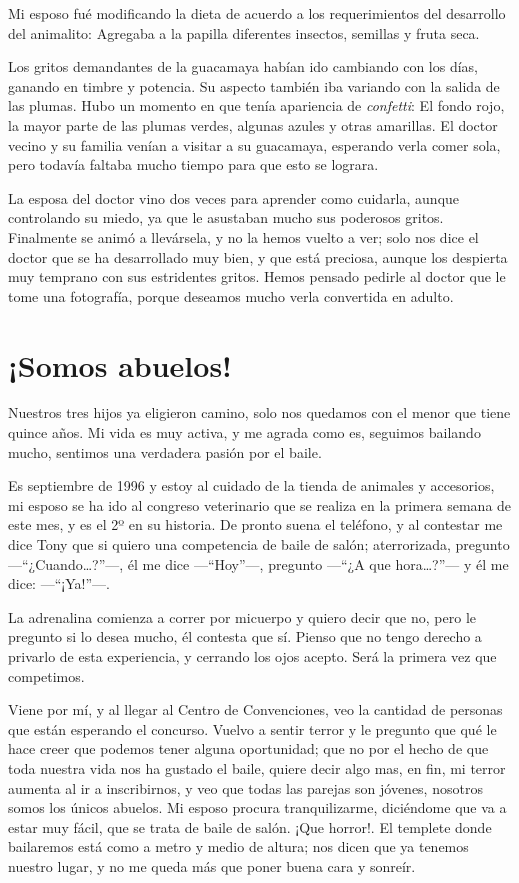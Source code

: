 \documentclass[letterpaper, 12pt]{book}
\begin{document}
Mi esposo fué modificando la dieta de acuerdo a los requerimientos del desarrollo del animalito: Agregaba a la papilla diferentes insectos, semillas y fruta seca. 

Los gritos demandantes de la guacamaya habían ido cambiando con los días, ganando en timbre y potencia. Su aspecto también iba variando con la salida de las plumas. Hubo un momento en que tenía apariencia de \textit{confetti}: El fondo rojo, la mayor parte de las plumas verdes, algunas azules y otras amarillas. El doctor vecino y su familia venían a visitar a su guacamaya, esperando verla comer sola, pero todavía faltaba mucho tiempo para que esto se lograra. 

La esposa del doctor vino dos veces para aprender como cuidarla, aunque controlando su miedo, ya que le asustaban mucho sus poderosos gritos. Finalmente se animó a llevársela, y no la hemos vuelto a ver; solo nos dice el doctor que se ha desarrollado muy bien, y que está preciosa, aunque los despierta muy temprano con sus estridentes gritos. Hemos pensado pedirle al doctor que le tome una fotografía, porque deseamos mucho verla convertida en adulto.

\chapter{¡Somos abuelos!}
Nuestros tres hijos ya eligieron camino, solo nos quedamos con el menor que tiene quince años. Mi vida es muy activa, y me agrada como es, seguimos bailando mucho, sentimos una verdadera pasión por el baile.  

Es septiembre de 1996 y estoy al cuidado de la tienda de animales y accesorios, mi esposo se ha ido al congreso veterinario que se realiza en la primera semana de este mes, y es el 2º en su historia. De pronto suena el teléfono, y al contestar me dice Tony que si quiero una competencia de baile de salón; aterrorizada, pregunto ---``¿Cuando\ldots?''---, él me dice ---``Hoy''---, pregunto ---``¿A que hora\ldots?''--- y él me dice: ---``¡Ya!''---.

La adrenalina comienza a correr por micuerpo y quiero decir que no, pero le pregunto si lo desea mucho, él contesta que sí. Pienso que no tengo derecho a privarlo de esta experiencia, y cerrando los ojos acepto. Será la primera vez que competimos.

Viene por mí, y al llegar al Centro de Convenciones, veo la cantidad de personas que están esperando el concurso. Vuelvo a sentir terror y le pregunto que qué le hace creer que podemos tener alguna oportunidad; que no por el hecho de que toda nuestra vida nos ha gustado el baile, quiere decir algo mas, en fin, mi terror aumenta al ir a inscribirnos, y veo que todas las parejas son jóvenes, nosotros somos los únicos abuelos. Mi esposo procura tranquilizarme, diciéndome que va a estar muy fácil, que se trata de baile de salón. ¡Que horror!. El templete donde bailaremos está como a metro y medio de altura; nos dicen que ya tenemos nuestro lugar, y no me queda más que poner buena cara y sonreír. 
\end{document}
